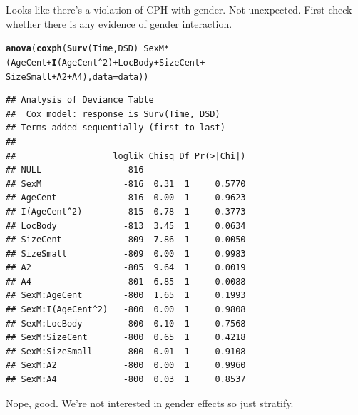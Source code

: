 \documentclass{article}\usepackage[]{graphicx}\usepackage[]{color}
\makeatletter
\newcommand{\hlnum}[1]{\textcolor[rgb]{0.686,0.059,0.569}{#1}}%
\newcommand{\hlopt}[1]{\textcolor[rgb]{0,0,0}{#1}}%
\newcommand{\hlstd}[1]{\textcolor[rgb]{0.345,0.345,0.345}{#1}}%
\newcommand{\hlkwc}[1]{\textcolor[rgb]{0.333,0.667,0.333}{#1}}%
\newcommand{\hlkwd}[1]{\textcolor[rgb]{0.737,0.353,0.396}{\textbf{#1}}}%
\newenvironment{kframe}{%
 \def\at@end@of@kframe{}%
 \ifinner\ifhmode%
  \def\at@end@of@kframe{\end{minipage}}%
  \begin{minipage}{\columnwidth}%
 \fi\fi%
 \def\FrameCommand##1{\hskip\@totalleftmargin \hskip-\fboxsep
 \colorbox{shadecolor}{##1}\hskip-\fboxsep
     \hskip-\linewidth \hskip-\@totalleftmargin \hskip\columnwidth}%
 \MakeFramed {\advance\hsize-\width
   \@totalleftmargin\z@ \linewidth\hsize
   \@setminipage}}%
 {\par\unskip\endMakeFramed%
 \at@end@of@kframe}
\newenvironment{knitrout}{}{} %
\makeatother
\begin{document}
Looks like there's a violation of CPH with gender.  Not unexpected.  First check whether there is any evidence of gender interaction.
\begin{knitrout}
\color{fgcolor}\begin{kframe}
\begin{alltt}
\hlkwd{anova}\hlstd{(}\hlkwd{coxph}\hlstd{(}\hlkwd{Surv}\hlstd{(Time, DSD)} \hlopt{~} \hlstd{SexM} \hlopt{*} \hlstd{(AgeCent} \hlopt{+} \hlkwd{I}\hlstd{(AgeCent}\hlopt{^}\hlnum{2}\hlstd{)} \hlopt{+} \hlstd{LocBody} \hlopt{+} \hlstd{SizeCent} \hlopt{+}
    \hlstd{SizeSmall} \hlopt{+} \hlstd{A2} \hlopt{+} \hlstd{A4),} \hlkwc{data} \hlstd{= data))}
\end{alltt}
\begin{verbatim}
## Analysis of Deviance Table
##  Cox model: response is Surv(Time, DSD)
## Terms added sequentially (first to last)
## 
##                   loglik Chisq Df Pr(>|Chi|)
## NULL                -816                    
## SexM                -816  0.31  1     0.5770
## AgeCent             -816  0.00  1     0.9623
## I(AgeCent^2)        -815  0.78  1     0.3773
## LocBody             -813  3.45  1     0.0634
## SizeCent            -809  7.86  1     0.0050
## SizeSmall           -809  0.00  1     0.9983
## A2                  -805  9.64  1     0.0019
## A4                  -801  6.85  1     0.0088
## SexM:AgeCent        -800  1.65  1     0.1993
## SexM:I(AgeCent^2)   -800  0.00  1     0.9808
## SexM:LocBody        -800  0.10  1     0.7568
## SexM:SizeCent       -800  0.65  1     0.4218
## SexM:SizeSmall      -800  0.01  1     0.9108
## SexM:A2             -800  0.00  1     0.9960
## SexM:A4             -800  0.03  1     0.8537
\end{verbatim}
\end{kframe}
\end{knitrout}
Nope, good.  We're not interested in gender effects so just stratify.
\end{document}
